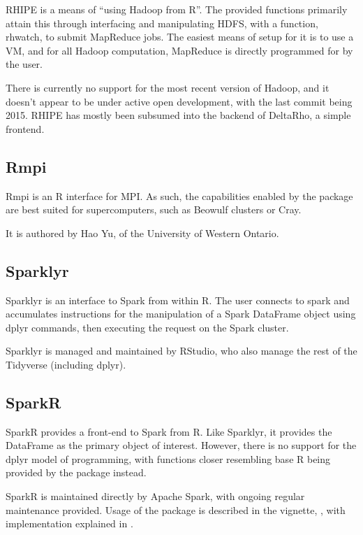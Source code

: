 \documentclass[10pt,a4paper]{article}
\begin{document}
RHIPE is a means of ``using Hadoop from R''\cite{deltarho:_rhipe}. The
provided functions primarily attain this through interfacing and
manipulating HDFS, with a function, rhwatch, to submit MapReduce jobs.
The easiest means of setup for it is to use a VM, and for all Hadoop
computation, MapReduce is directly programmed for by the user.

There is currently no support for the most recent version of Hadoop,
and it doesn't appear to be under active open development, with the
last commit being 2015. RHIPE has mostly been subsumed into the
backend of DeltaRho, a simple frontend.
  
\subsection{Rmpi}
\label{sec:rmpi}

Rmpi is an R interface for MPI\cite{yu02:_rmpi}. As such, the
capabilities enabled by the package are best suited for
supercomputers, such as Beowulf clusters or Cray.

It is authored by Hao Yu, of the University of Western Ontario.

\subsection{Sparklyr}
\label{sec:sparklyr}

Sparklyr is an interface to Spark from within R\cite{luraschi20}. The user connects to
spark and accumulates instructions for the manipulation of a Spark
DataFrame object using dplyr commands, then executing the request on
the Spark cluster.

Sparklyr is managed and maintained by RStudio, who also manage the
rest of the Tidyverse (including dplyr).

\subsection{SparkR}
\label{sec:sparkr}

SparkR provides a front-end to Spark from
R\cite{venkataraman20:_spark}. Like Sparklyr, it provides the
DataFrame as the primary object of interest. However, there is no
support for the dplyr model of programming, with functions closer
resembling base R being provided by the package instead.

SparkR is maintained directly by Apache Spark, with ongoing regular
maintenance provided. Usage of the package is described in the
vignette, \textcite{venktaraman19:_spark_pract_guide}, with
implementation explained in \textcite{venkataraman2016sparkr}.
\end{document}
